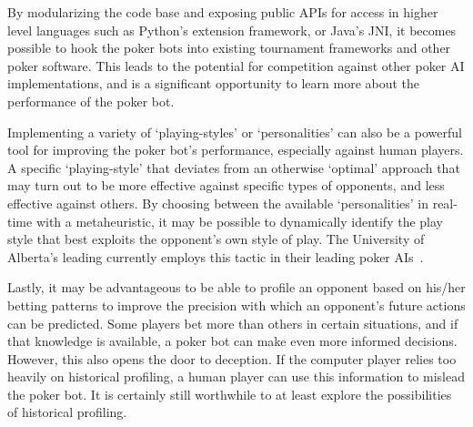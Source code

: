 By modularizing the code base and exposing public APIs for access in higher level languages such as Python's extension framework, or Java's JNI, it becomes possible to hook the poker bots into existing tournament frameworks and other poker software.
This leads to the potential for competition against other poker AI implementations, and is a significant opportunity to learn more about the performance of the poker bot.

Implementing a variety of `playing-styles' or `personalities' can also be a powerful tool for improving the poker bot's performance, especially against human players.
A specific `playing-style' that deviates from an otherwise `optimal' approach that may turn out to be more effective against specific types of opponents, and less effective against others.
By choosing between the available `personalities' in real-time with a metaheuristic, it may be possible to dynamically identify the play style that best exploits the opponent's own style of play.
The University of Alberta's leading currently employs this tactic in their leading poker AIs~\cite{PolarisCoached2007}.

Lastly, it may be advantageous to be able to profile an opponent based on his/her betting patterns to improve the precision with which an opponent's future actions can be predicted.
Some players bet more than others in certain situations, and if that knowledge is available, a poker bot can make even more informed decisions.
However, this also opens the door to deception.
If the computer player relies too heavily on historical profiling, a human player can use this information to mislead the poker bot.
It is certainly still worthwhile to at least explore the possibilities of historical profiling.

